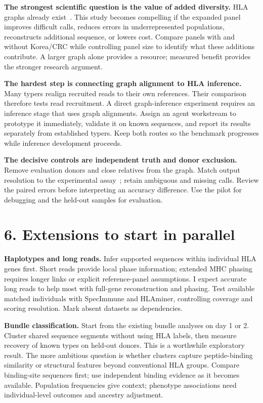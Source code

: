 \documentclass[11pt,a4paper]{article}
\begin{document}
\textbf{The strongest scientific question is the value of added diversity.}
HLA graphs already exist~\cite{hlala}. This study becomes compelling if the
expanded panel improves difficult calls, reduces errors in underrepresented
populations, reconstructs additional sequence, or lowers cost. Compare panels
with and without Korea/CRC while controlling panel size to identify what these
additions contribute. A larger graph alone provides a resource; measured benefit
provides the stronger research argument.

\textbf{The hardest step is connecting graph alignment to HLA inference.}
Many typers realign recruited reads to their own references. Their comparison
therefore tests read recruitment. A direct graph-inference experiment requires
an inference stage that uses graph alignments. Assign an agent workstream to
prototype it immediately, validate it on known sequences, and report its results
separately from established typers. Keep both routes so the benchmark progresses
while inference development proceeds.

\textbf{The decisive controls are independent truth and donor exclusion.}
Remove evaluation donors and close relatives from the graph. Match output
resolution to the experimental assay~\cite{truth}; retain ambiguous and missing
calls. Review the paired errors before interpreting an accuracy difference.
Use the pilot for debugging and the held-out samples for evaluation.

\section*{6. Extensions to start in parallel}
\textbf{Haplotypes and long reads.} Infer supported sequences within individual
HLA genes first. Short reads provide local phase information; extended MHC
phasing requires longer links or explicit reference-panel assumptions. I expect
accurate long reads to help most with full-gene reconstruction and phasing.
Test available matched individuals with SpecImmune and HLAminer, controlling
coverage and scoring resolution. Mark absent datasets as dependencies.

\textbf{Bundle classification.} Start from the existing bundle analyses on day 1
or 2. Cluster shared sequence segments without using HLA labels, then measure
recovery of known types on held-out donors. This is a worthwhile exploratory
result. The more ambitious question is whether clusters capture peptide-binding
similarity or structural features beyond conventional HLA groups. Compare
binding-site sequences first; use independent binding evidence as it becomes
available. Population frequencies give context; phenotype associations need
individual-level outcomes and ancestry adjustment.
\end{document}
